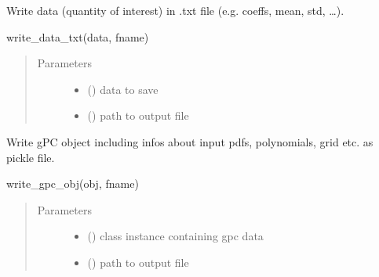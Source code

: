 \documentclass[letterpaper,10pt,english,openany,oneside]{sphinxmanual}
\begin{document}

\begin{fulllineitems}
\label{\detokenize{pygpc:pygpc.rw.write_data_txt}}
Write data (quantity of interest) in .txt file (e.g. coeffs, mean, std, …).

write\_data\_txt(data, fname)
\begin{quote}\begin{description}
\item[{Parameters}] \leavevmode\begin{itemize}
\item {} 
 () \textendash{} data to save

\item {} 
 () \textendash{} path to output file

\end{itemize}

\end{description}\end{quote}

\end{fulllineitems}


\begin{fulllineitems}
\label{\detokenize{pygpc:pygpc.rw.write_gpc_pkl}}
Write gPC object including infos about input pdfs, polynomials, grid etc. as pickle file.

write\_gpc\_obj(obj, fname)
\begin{quote}\begin{description}
\item[{Parameters}] \leavevmode\begin{itemize}
\item {} 
 ({\hyperref[\detokenize{pygpc:pygpc.gpc.gPC}]{}}) \textendash{} class instance containing gpc data

\item {} 
 () \textendash{} path to output file

\end{itemize}

\end{description}\end{quote}

\end{fulllineitems}
\end{document}
